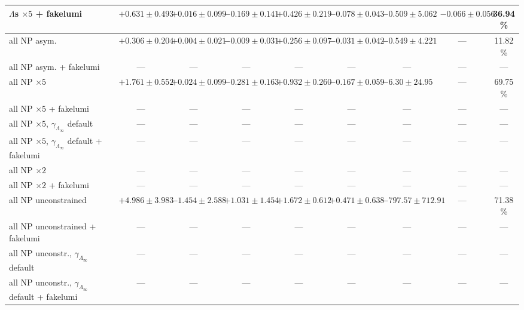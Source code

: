 \documentclass[landscape]{article}
\begin{document}
\begin{table}[h]
{\begin{tabular}{lcccccccc}
    $\Lambda$s $\times 5$ + fakelumi & $+0.631\pm0.493$ & $+0.016\pm0.099$ & $-0.169\pm0.141$ & $+0.426\pm0.219$ & $-0.078\pm0.043$ & $-0.509\pm5.062$ & $-0.066\pm0.056$ & 36.94\% \\
    \hline
    all NP asym. & $+0.306\pm0.204$ & $+0.004\pm0.021$ & $-0.009\pm0.031$ & $+0.256\pm0.097$ & $-0.031\pm0.042$ & $-0.549\pm4.221$ & --- & 11.82\% \\
    all NP asym. + fakelumi & --- & --- & --- & --- & --- & --- & --- & --- \\
    \hline
    all NP $\times 5$ & $+1.761\pm0.552$ & $+0.024\pm0.099$ & $-0.281\pm0.163$ & $+0.932\pm0.260$ & $-0.167\pm0.059$ & $-6.30\pm24.95$ & --- & 69.75\% \\
    all NP $\times 5$ + fakelumi & --- & --- & --- & --- & --- & --- & --- & --- \\
    \hline
    all NP $\times 5$, $\gamma_{\Lambda_\infty}$ default & --- & --- & --- & --- & --- & --- & --- & --- \\
    all NP $\times 5$, $\gamma_{\Lambda_\infty}$ default + fakelumi & --- & --- & --- & --- & --- & --- & --- & --- \\
    \hline
    all NP $\times 2$ & --- & --- & --- & --- & --- & --- & --- & --- \\
    all NP $\times 2$ + fakelumi & --- & --- & --- & --- & --- & --- & --- & --- \\
    \hline
    all NP unconstrained & $+4.986\pm3.983$ & $-1.454\pm2.588$ & $+1.031\pm1.454$ & $+1.672\pm0.612$ & $+0.471\pm0.638$ & $-797.57\pm712.91$ & --- & 71.38\% \\
    all NP unconstrained + fakelumi & --- & --- & --- & --- & --- & --- & --- & --- \\
    \hline
    all NP unconstr., $\gamma_{\Lambda_\infty}$ default & --- & --- & --- & --- & --- & --- & --- & --- \\
    all NP unconstr., $\gamma_{\Lambda_\infty}$ default + fakelumi & --- & --- & --- & --- & --- & --- & --- & --- \\
    \hline\hline
  \end{tabular}%
  }
\end{table}
\end{document}
